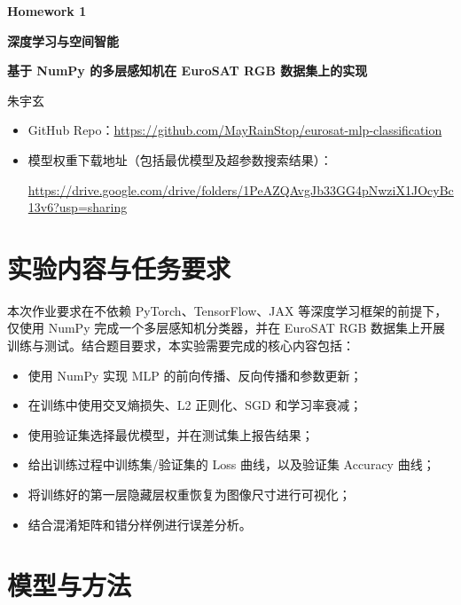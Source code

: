 \documentclass[UTF8,a4paper,11pt]{ctexart}
\begin{document}
\begin{center}
    {\bfseries Homework 1\par}
    \vspace{0.6em}
    {\bfseries 深度学习与空间智能\par}
    \vspace{1em}
    {\bfseries 基于 NumPy 的多层感知机在 EuroSAT RGB 数据集上的实现\par}
    \vspace{1.1em}
    { 朱宇玄\par}
\end{center}
\vspace{0.8em}

\begin{itemize}
	\item GitHub Repo：\url{https://github.com/MayRainStop/eurosat-mlp-classification}
	\\
	\item 模型权重下载地址（包括最优模型及超参数搜索结果）：
	
	\url{https://drive.google.com/drive/folders/1PeAZQAvgJb33GG4pNwziX1JOcyBc13v6?usp=sharing}
\end{itemize}


\section{实验内容与任务要求}

本次作业要求在不依赖 PyTorch、TensorFlow、JAX 等深度学习框架的前提下，仅使用 NumPy 完成一个多层感知机分类器，并在 EuroSAT RGB 数据集上开展训练与测试。结合题目要求，本实验需要完成的核心内容包括：

\begin{itemize}
    \item 使用 NumPy 实现 MLP 的前向传播、反向传播和参数更新；
    \item 在训练中使用交叉熵损失、L2 正则化、SGD 和学习率衰减；
    \item 使用验证集选择最优模型，并在测试集上报告结果；
    \item 给出训练过程中训练集/验证集的 Loss 曲线，以及验证集 Accuracy 曲线；
    \item 将训练好的第一层隐藏层权重恢复为图像尺寸进行可视化；
    \item 结合混淆矩阵和错分样例进行误差分析。
\end{itemize}

\section{模型与方法}
\end{document}
